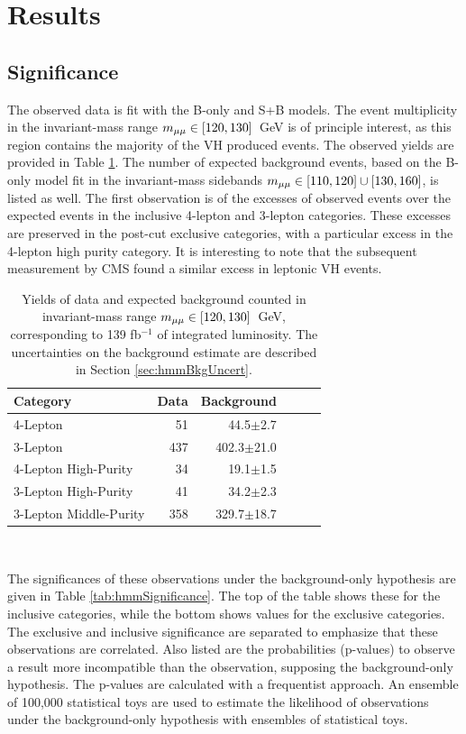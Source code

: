 
\section{Results}\label{sec:hmmResults}
\subsection{Significance}

The observed data is fit with the B-only and S+B models.
The event multiplicity in the invariant-mass range $m_{\mu\mu}\in[120,130]$~GeV is of principle interest, as this region contains the majority of the VH produced events.
The observed yields are provided in Table \ref{tab:hmmResultNdat}.
The number of expected background events, based on the B-only model fit in the invariant-mass sidebands $m_{\mu\mu}\in[110,120]\cup[130,160]$, is listed as well.
The first observation is of the excesses of observed events over the expected events in the inclusive 4-lepton and 3-lepton categories.
These excesses are preserved in the post-cut exclusive categories, with a particular excess in the 4-lepton high purity category.
It is interesting to note that the subsequent measurement by CMS found a similar excess in leptonic VH events\cite{cmsHmm}. 

\begin{table}[htp]
\caption{
Yields of data and expected background counted in invariant-mass range $m_{\mu\mu}\in[120,130]$~GeV, corresponding to 139 fb$^{-1}$ of integrated luminosity.
The uncertainties on the background estimate are described in Section \ref{sec:hmmBkgUncert}.
}
\begin{center}
\begin{tabular}{l r r r r r}\toprule
Category               & Data    & Background \\
\midrule
4-Lepton               & 51      & 44.5$\pm$2.7 \\
3-Lepton               & 437     & 402.3$\pm$21.0 \\
\midrule
4-Lepton High-Purity   & 34      & 19.1$\pm$1.5 \\
3-Lepton High-Purity   & 41      & 34.2$\pm$2.3 \\
3-Lepton Middle-Purity & 358     & 329.7$\pm$18.7 \\
\bottomrule\end{tabular}\\
\label{tab:hmmResultNdat}
\end{center}
\end{table}

The significances of these observations under the background-only hypothesis are given in Table \ref{tab:hmmSignificance}.
The top of the table shows these for the inclusive categories, while the bottom shows values for the exclusive categories.
The exclusive and inclusive significance are separated to emphasize that these observations are correlated.
Also listed are the probabilities (p-values) to observe a result more incompatible than the observation, supposing the background-only hypothesis.
The p-values are calculated with a frequentist approach. 
An ensemble of 100,000 statistical toys are used to estimate the likelihood of observations under the background-only hypothesis with ensembles of statistical toys.

